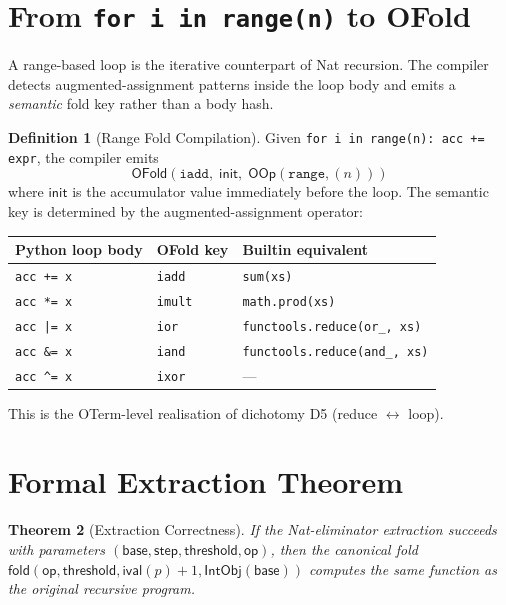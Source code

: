 \documentclass[11pt,a4paper]{report}
\theoremstyle{definition}
\newtheorem{definition}{Definition}[chapter]
\theoremstyle{plain}
\newtheorem{theorem}[definition]{Theorem}
\newcommand{\fold}{\mathsf{fold}}
\newcommand{\op}{\mathsf{op}}
\begin{document}
\section{From \texttt{for i in range(n)} to OFold}

A range-based loop is the iterative counterpart of Nat recursion.
The compiler detects augmented-assignment patterns inside the loop body
and emits a \emph{semantic} fold key rather than a body hash.

\begin{definition}[Range Fold Compilation]
\label{def:range-fold}
Given \texttt{for i in range(n): acc \texttt{+=} expr}, the compiler emits
\[
  \mathsf{OFold}(\texttt{iadd},\; \mathsf{init},\; \mathsf{OOp}(\texttt{range}, (n)))
\]
where $\mathsf{init}$ is the accumulator value immediately before the loop.
The semantic key is determined by the augmented-assignment operator:
\begin{center}
\begin{tabular}{lll}
\toprule
\textbf{Python loop body} & \textbf{OFold key} & \textbf{Builtin equivalent} \\
\midrule
\texttt{acc += x}  & \texttt{iadd}  & \texttt{sum(xs)} \\
\texttt{acc *= x}  & \texttt{imult} & \texttt{math.prod(xs)} \\
\texttt{acc |= x}  & \texttt{ior}   & \texttt{functools.reduce(or\_, xs)} \\
\texttt{acc \&= x} & \texttt{iand}  & \texttt{functools.reduce(and\_, xs)} \\
\texttt{acc \^{}= x} & \texttt{ixor}  & --- \\
\bottomrule
\end{tabular}
\end{center}
This is the OTerm-level realisation of dichotomy D5 (reduce $\leftrightarrow$ loop).
\end{definition}

\section{Formal Extraction Theorem}

\begin{theorem}[Extraction Correctness]
\label{thm:nat-elim-correct}
If the Nat-eliminator extraction succeeds with parameters
$(\mathsf{base}, \mathsf{step}, \mathsf{threshold}, \op)$, then the
canonical fold $\fold(\op, \mathsf{threshold}, \mathsf{ival}(p) + 1,
\mathsf{IntObj}(\mathsf{base}))$ computes the same function as the
original recursive program.
\end{theorem}
\end{document}
